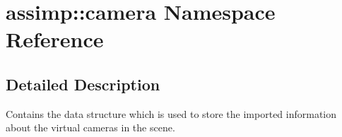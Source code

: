 \hypertarget{namespaceassimp_1_1camera}{\section{assimp\+:\+:camera Namespace Reference}
\label{namespaceassimp_1_1camera}
}


\subsection{Detailed Description}
Contains the data structure which is used to store the imported information about the virtual cameras in the scene. 
